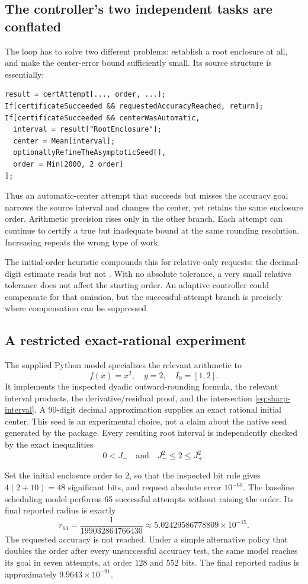 \subsection{The controller's two independent tasks are conflated}

The loop has to solve two different problems: establish a root enclosure at all, and make the center-error bound sufficiently small. Its source structure is essentially:
\begin{lstlisting}
result = certAttempt[..., order, ...];
If[certificateSucceeded && requestedAccuracyReached, return];
If[certificateSucceeded && centerWasAutomatic,
  interval = result["RootEnclosure"];
  center = Mean[interval];
  optionallyRefineTheAsymptoticSeed[],
  order = Min[2000, 2 order]
];
\end{lstlisting}
Thus an automatic-center attempt that succeeds but misses the accuracy goal narrows the source interval and changes the center, yet retains the same enclosure order. Arithmetic precision rises only in the other branch. Each attempt can continue to certify a true but inadequate bound at the same rounding resolution. Increasing  repeats the wrong type of work.\cite{cert}

The initial-order heuristic compounds this for relative-only requests: the decimal-digit estimate reads  but not . With no absolute tolerance, a very small relative tolerance does not affect the starting order. An adaptive controller could compensate for that omission, but the successful-attempt branch is precisely where compensation can be suppressed.\cite{cert}

\subsection{A restricted exact-rational experiment}

The supplied Python model specializes the relevant arithmetic to
\[
 f(x)=x^2,\quad y=2,\quad I_0=[1,2].
\]
It implements the inspected dyadic outward-rounding formula, the relevant interval products, the derivative/residual proof, and the intersection \eqref{eq:sharp-interval}. A 90-digit decimal approximation supplies an exact rational initial center. This seed is an experimental choice, not a claim about the native seed generated by the package. Every resulting root interval is independently checked by the exact inequalities
\[
 0<J_-\quad\text{and}\quad J_-^2\le2\le J_+^2.
\]

Set the initial enclosure order to $2$, so that the inspected bit rule gives $4(2+10)=48$ significant bits, and request absolute error $10^{-60}$. The baseline scheduling model performs 65 successful attempts without raising the order. Its final reported radius is exactly
\begin{equation}
 r_{64}=\frac{1}{199032864766430}
 \approx5.02429586778809\times10^{-15}.
\end{equation}
The requested accuracy is not reached. Under a simple alternative policy that doubles the order after every unsuccessful accuracy test, the same model reaches its goal in seven attempts, at order $128$ and 552 bits. The final reported radius is approximately $9.9643\times10^{-91}$.

